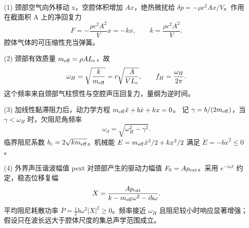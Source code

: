 (1) 颈部空气向外移动 x，空腔体积增加 \(Ax\)，绝热微扰给 \(\delta p=-\rho c^2Ax/V\)。作用在截面积 A 上的净回复力
\[
F=-\frac{\rho c^2A^2}{V}x=-kx,\qquad k=\frac{\rho c^2A^2}{V}.
\]
腔体气体的可压缩性充当弹簧。

(2) 颈部有效质量 \(m_{\rm eff}=\rho A L_e\)，故
\[
\omega_H=\sqrt{\frac{k}{m_{\rm eff}}}
=c\sqrt{\frac{A}{VL_e}},\qquad f_H=\frac{\omega_H}{2\pi}.
\]
这个频率来自颈部气柱惯性与空腔声压回复力，量纲为逆时间。

(3) 加线性黏滞阻力后，动力学方程
\(m_{\rm eff}\ddot x+b\dot x+kx=0\)。
记 \(\gamma=b/(2m_{\rm eff})\)，当 \(\gamma<\omega_H\) 时，欠阻尼角频率
\[
\omega_d=\sqrt{\omega_H^2-\gamma^2}.
\]
临界阻尼系数 \(b_c=2\sqrt{km_{\rm eff}}\)。机械能 \(E=m_{\rm eff}\dot x^2/2+kx^2/2\) 满足 \(\dot E=-b\dot x^2\le0\)。

(4) 外界声压谐波幅值 pext 对颈部产生的驱动力幅值 \(F_0=A p_{\rm ext}\)。采用 \(e^{-i\omega t}\) 约定，稳态位移复幅
\[
X=\frac{A p_{\rm ext}}{k-m_{\rm eff}\omega^2-i b\omega}.
\]
平均阻尼耗散功率 \(\overline P=\frac12b\omega^2|X|^2\ge0\)。频率接近 \(\omega_H\) 且阻尼较小时响应显著增强；假设只在波长远大于腔体尺度的集总声学范围成立。
